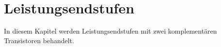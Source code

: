 \chapter{Leistungsendstufen}

In diesem Kapitel werden Leistungsendstufen mit zwei komplementären Transistoren behandelt.